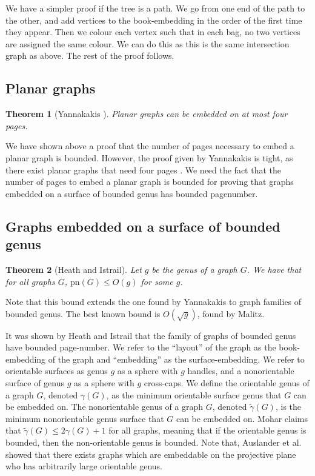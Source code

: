 \documentclass[]{report}
\newcommand{\pn}{\text{pn}}
\newtheorem{theorem}{Theorem}
\theoremstyle{definition}
\numberwithin{theorem}{section}
\numberwithin{equation}{section}
\begin{document}
We have a simpler proof if the tree is a path. We go from one end of the path to the other, and add vertices to the book-embedding in the order of the first time they appear. Then we colour each vertex such that in each bag, no two vertices are assigned the same colour. We can do this as this is the same intersection graph as above. The rest of the proof follows.

\subsection{Planar graphs}\label{ssec:Planar_Graphs}
\begin{theorem}[Yannakakis \cite{yannakakisEmbeddingPlanarGraphs1989}] \label{thm:4Pages_Planar}
	Planar graphs can be embedded on at most four pages.
\end{theorem}
We have shown above a proof that the number of pages necessary to embed a planar graph is bounded. However, the proof given by Yannakakis is tight, as there exist planar graphs that need four pages \cite{yannakakisPlanarGraphsThat2020} \cite{kaufmannFourPagesAre2020}. We need the fact that the number of pages to embed a planar graph is bounded for proving that graphs embedded on a surface of bounded genus has bounded pagenumber. 

\subsection{Graphs embedded on a surface of bounded genus}\label{ssec:pagenumber_bounded_genus}
\begin{theorem}[Heath and Istrail\cite{heathPagenumberGenusGraphs1992}]\label{thm:Genus_pagenumber_bound}
	Let $g$ be the genus of a graph $G$. We have that for all graphs $G$, $\pn(G) \leq O(g)$ for some $g$.
\end{theorem}
Note that this bound extends the one found by Yannakakis \cite{yannakakisEmbeddingPlanarGraphs1989} to graph families of bounded genus. 
The best known bound is $O(\sqrt{g})$, found by Malitz\cite{malitzGenusGraphsHave1994}.

It was shown by Heath and Istrail that the family of graphs of bounded genus have bounded page-number. 
We refer to the ``layout'' of the graph as the book-embedding of the graph and ``embedding'' as the surface-embedding. We refer to orientable surfaces as genus $g$ as a sphere with $g$ handles, and a nonorientable surface of genus $g$ as a sphere with $g$ cross-caps. We define the orientable genus of a graph $G$, denoted $\gamma(G)$, as the minimum orientable surface genus that $G$ can be embedded on. The nonorientable genus of a graph $G$, denoted $\tilde{\gamma}(G)$, is the minimum nonorientable genus surface that $G$ can be embedded on. Mohar\cite{moharOrientableGenusGraphs1998} claims that $\tilde{\gamma}(G) \leq 2 \gamma(G) + 1$ for all graphs, meaning that if the orientable genus is bounded, then the non-orientable genus is bounded. Note that, Auslander et al.\cite{auslanderImbeddingGraphsManifolds1963} showed that there exists graphs which are embeddable on the projective plane who has arbitrarily large orientable genus. 
\end{document}
